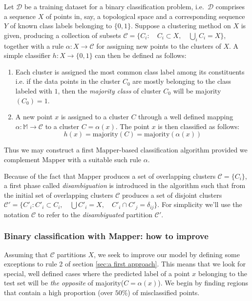 Let $\mathcal{D}$ be a training dataset for a binary classification problem, i.e.\ $\mathcal{D}$ comprises a  sequence $X$ of points in, say, a topological space and a corresponding sequence $Y$ of known class labels belonging to $\{0, 1 \}$.  Suppose a clustering method on $X$ is given, producing a collection of subsets $\mathcal C =  \{C_i:\quad C_i\subset X, \quad\bigcup_i C_i=X\}$, together with a rule $\alpha: X \rightarrow \mathcal C$ for assigning new points to the clusters of $X$.  A simple classifier $h: X\rightarrow \{0,1\}$ can then be defined as follows: 
\begin{enumerate}
	\item Each cluster is assigned the most common class label among its constituents i.e. if the data points in the cluster $C_0$ are mostly belonging to the class labeled with $1$, then the \textit{majority class} of cluster $C_0$ will be  majority$(C_0)=1$. 
	\item A new point $x$ is assigned to a cluster $C$ through a well defined mapping $\alpha: \mathbb M \rightarrow \mathcal C$ to a cluster $C=\alpha(x)$. The point $x$ is then classified as follows: $$h(x)=\text{majority}(C)=\text{majority}(\alpha(x))$$ 
\end{enumerate}

Thus we may construct a first Mapper-based classification algorithm provided we complement Mapper with a suitable such rule $\alpha$. 

Because of the fact that Mapper produces a set of overlapping clusters $\mathcal C=\{C_i\}$, a first phase called \textit{disambiguation} is introduced in the algorithm such that from the initial set of overlapping clusters $\mathcal C$ produces a set of disjoint clusters $\mathcal C'=\{C'_i: C'_i\subset C_i, \quad\bigcup C'_i = X,\quad C'_i\cap C'_j = \delta_{ij}\}$. For simplicity we'll use the notation $\mathcal{C}$ to refer to the \textit{disambiguated } partition $\mathcal{C'}$.

\subsubsection*{Binary classification with Mapper: how to improve}

Assuming that $\mathcal{C}$ partitions $X$, we seek to improve our model by defining some exceptions to rule 2 of section \ref{sec:a first approach}. This means that we look for special, well defined cases where the predicted label of a point $x$ belonging to the test set will be \textit{the opposite} of majority($C=\alpha(x)$). We begin by finding regions that contain a high proportion (over $50\%$) of misclassified points.

